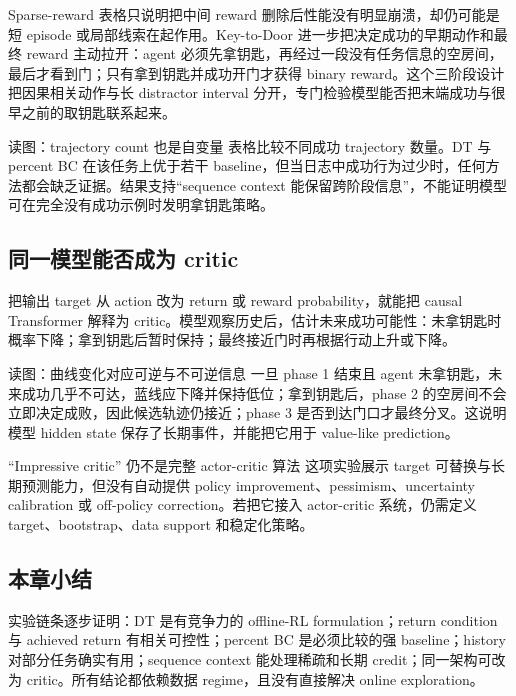 Sparse-reward 表格只说明把中间 reward 删除后性能没有明显崩溃，却仍可能是短 episode 或局部线索在起作用。Key-to-Door 进一步把决定成功的早期动作和最终 reward 主动拉开：agent 必须先拿钥匙，再经过一段没有任务信息的空房间，最后才看到门；只有拿到钥匙并成功开门才获得 binary reward。这个三阶段设计把因果相关动作与长 distractor interval 分开，专门检验模型能否把末端成功与很早之前的取钥匙联系起来。


\begin{knowledgebox}{读图：trajectory count 也是自变量}
表格比较不同成功 trajectory 数量。DT 与 percent BC 在该任务上优于若干 baseline，但当日志中成功行为过少时，任何方法都会缺乏证据。结果支持“sequence context 能保留跨阶段信息”，不能证明模型可在完全没有成功示例时发明拿钥匙策略。
\end{knowledgebox}

\subsection{同一模型能否成为 critic}

把输出 target 从 action 改为 return 或 reward probability，就能把 causal Transformer 解释为 critic。模型观察历史后，估计未来成功可能性：未拿钥匙时概率下降；拿到钥匙后暂时保持；最终接近门时再根据行动上升或下降。


\begin{knowledgebox}{读图：曲线变化对应可逆与不可逆信息}
一旦 phase 1 结束且 agent 未拿钥匙，未来成功几乎不可达，蓝线应下降并保持低位；拿到钥匙后，phase 2 的空房间不会立即决定成败，因此候选轨迹仍接近；phase 3 是否到达门口才最终分叉。这说明模型 hidden state 保存了长期事件，并能把它用于 value-like prediction。
\end{knowledgebox}

\begin{warningbox}{“Impressive critic” 仍不是完整 actor-critic 算法}
这项实验展示 target 可替换与长期预测能力，但没有自动提供 policy improvement、pessimism、uncertainty calibration 或 off-policy correction。若把它接入 actor-critic 系统，仍需定义 target、bootstrap、data support 和稳定化策略。
\end{warningbox}

\subsection{本章小结}

实验链条逐步证明：DT 是有竞争力的 offline-RL formulation；return condition 与 achieved return 有相关可控性；percent BC 是必须比较的强 baseline；history 对部分任务确实有用；sequence context 能处理稀疏和长期 credit；同一架构可改为 critic。所有结论都依赖数据 regime，且没有直接解决 online exploration。

